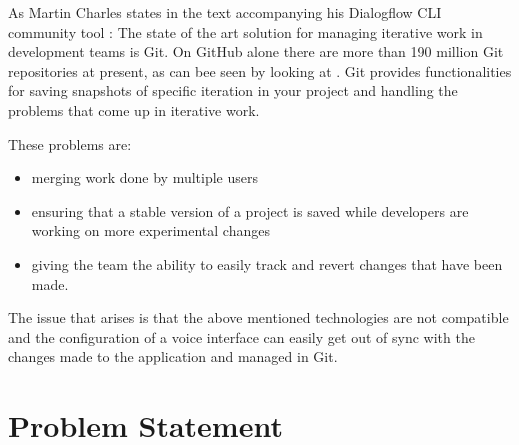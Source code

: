 As Martin Charles states in the text accompanying his Dialogflow CLI community tool \cite[page 1]{0xcaff2018}:
The state of the art solution for managing iterative work in development teams is Git. On GitHub alone there are more than 190 million Git repositories at present, as can bee seen by looking at \cite{Githuba}.
Git provides functionalities for saving snapshots of specific iteration in your project and handling the problems that come up in iterative work.\\
\begin{samepage}
    These problems are:
    \begin{itemize}
        \item merging work done by multiple users
        \item ensuring that a stable version of a project is saved while developers are working on more experimental changes
        \item giving the team the ability to easily track and revert changes that have been made.
    \end{itemize}
\end{samepage}

The issue that arises is that the above mentioned technologies are not compatible and the configuration of a voice interface can easily get out of sync with the changes made to the application and managed in Git.

\chapter{Problem Statement}

